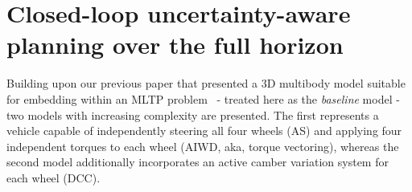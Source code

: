 \section{Closed-loop uncertainty-aware planning over the full horizon}
\label{sec:closed_loop_planning}

Building upon our previous paper that presented a 3D multibody model suitable for embedding within an MLTP problem~\cite{Domenighini:Designs:2023} - treated here as the \emph{baseline} model - two models with increasing complexity are presented. The first represents a vehicle capable of independently steering all four wheels (AS) and applying four independent torques to each wheel (AIWD, aka, torque vectoring), whereas the second model additionally incorporates an active camber variation system for each wheel (DCC).


